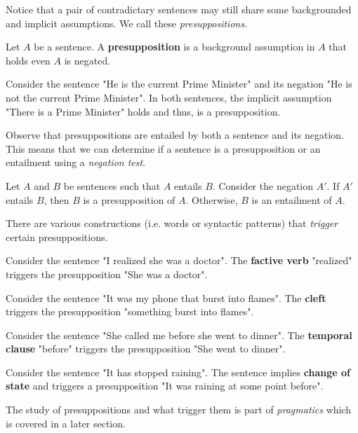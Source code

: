 \documentclass{article}
\begin{document}
Notice that a pair of contradictary sentences may still share some backgrounded and implicit assumptions. We call these \emph{presuppositions}.

\begin{definition}[Presupposition]
  Let $A$ be a sentence. A \textbf{presupposition} is a background assumption in $A$ that holds even $A$ is negated.
\end{definition}

\begin{example}
  Consider the sentence "He is the current Prime Minister" and its negation "He is not the current Prime Minister". In both sentences, the implicit assumption "There is a Prime Minister" holds and thus, is a presupposition.
\end{example}

Observe that presuppositions are entailed by both a sentence and its negation. This means that we can determine if a sentence is a presupposition or an entailment using a \emph{negation test}.

\begin{example}
  Let $A$ and $B$ be sentences such that $A$ entails $B$. Consider the negation $A'$. If $A'$ entails $B$, then $B$ is a presupposition of $A$. Otherwise, $B$ is an entailment of $A$.
\end{example}

There are various constructions (i.e. words or syntactic patterns) that \emph{trigger} certain presuppositions.

\begin{example}
  Consider the sentence "I realized she was a doctor". The \textbf{factive verb} "realized" triggers the presupposition "She was a doctor".
\end{example}

\begin{example}[Cleft]
  Consider the sentence "It was my phone that burst into flames". The \textbf{cleft} triggers the presupposition "something burst into flames".
\end{example}

\begin{example}
  Consider the sentence "She called me before she went to dinner". The \textbf{temporal clause} "before" triggers the presupposition "She went to dinner".
\end{example}

\begin{example}
  Consider the sentence "It has stopped raining". The sentence implies \textbf{change of state} and triggers a presupposition "It was raining at some point before".
\end{example}

The study of presuppositions and what trigger them is part of \emph{pragmatics} which is covered in a later section.
\end{document}

